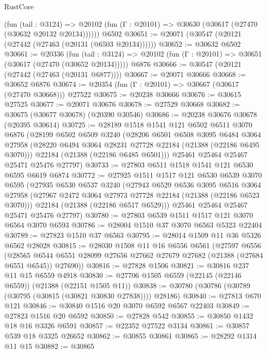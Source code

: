 \begin{lexlean}{RustCore}
\begin{coremodule}
      (fun (tail : @3124) =>
      @20102 (fun (Γ : @20101) => @30630 (@30617 (@27470 (@30632 @20132 @20134))))))
    @6502
@30651 := @20071 (@30547 (@20121 (@27442 (@27463 (@20131 (@6503 @20134))))))
@30652 := @30632 @6502
@30661 := @20336
    (fun (tail : @3124) => @20102 (fun (Γ : @20101) => @30651 (@30617 (@27470 (@30652 @20134)))))
    @6876
@30666 := @30547 (@20121 (@27442 (@27463 (@20131 @6877))))
@30667 := @20071 @30666
@30668 := @30652 @6876
@30674 := @20354 (fun (Γ : @20101) => @30667 (@30617 (@27470 @30668))) @27522
@30675 := @20238 @30666
@30676 := @30615 @27525
@30677 := @20071 @30676
@30678 := @27529 @30668
@30682 := @30675 (@30677 @30678) (@20390 @30546)
@30686 := @20238 @30676 @30678 (@20395 @30614)
@30725 := @28189
    @1518
    @1541
    @121
    @6502
    @6511
    @3070
    @6876
    (@28199
      @6502
      @6509
      @3240
      (@28206
        @6501
        @6508
        @3095
        @6484
        @3064
        @27958
        (@28220 @6494 @3064 @28231 @27728 @22184 (@21388 (@22186 @6495 @3070)))
        @22184
        (@21388 (@22186 @6485 @6501)))
      @25461
      @25464
      @25467
      @25471
      @25476
      @27797)
@30733 := @27803 @6511 @1518 @1541 @121 @6530 @6595 @6619 @6874
@30772 := @27925
    @1511
    @1517
    @121
    @6530
    @6539
    @3070
    @6595
    (@27935
      @6530
      @6537
      @3240
      (@27943
        @6529
        @6536
        @3095
        @6516
        @3064
        @27958
        (@27967 @2472 @3064 @27973 @27728 @22184 (@21388 (@22186 @6523 @3070)))
        @22184
        (@21388 (@22186 @6517 @6529)))
      @25461
      @25464
      @25467
      @25471
      @25476
      @27797)
@30780 := @27803 @6539 @1511 @1517 @121 @3070 @6564 @3070 @6593
@30786 := @28004 @1510 @37 @3070 @6563 @5323 @22404
@30789 := @27823 @1510 @37 @6563
@30795 := @28014 @1509 @11 @36 @5326 @6562 @28028
@30815 := @28030
    @1508
    @11
    @16
    @6556
    @6561
    (@27597
      @6556
      (@28565 @6544 @6551 @28099 @27656 @27662 @27679 @27682 (@21388 (@27684 @6551 @6545)) @27690))
@30816 := @27828 @1506
@30821 := @30816 @237 @11 @15 @6559 @4918
@30830 := @27706 @1505 @6559 (@22145 (@22146 @6559)) (@21388 (@22151 @1505 @11))
@30838 := @30780 (@30786 (@30789 (@30795 (@30815 (@30821 @30830 @27838)))) @28186)
@30840 := @27813 @670 @121
@30846 := @30840 @1516 @20 @3070 @6592 @6567 @22403
@30849 := @27823 @1516 @20 @6592
@30850 := @27828 @542
@30855 := @30850 @1432 @18 @16 @3326 @6591
@30857 := @22352 @27522 @3134
@30861 := @30857 @539 @18 @3325 @26652
@30862 := @30855 @30861
@30865 := @28292 @1314 @11 @15
@30882 := @30865

\end{coremodule}
\end{lexlean}
